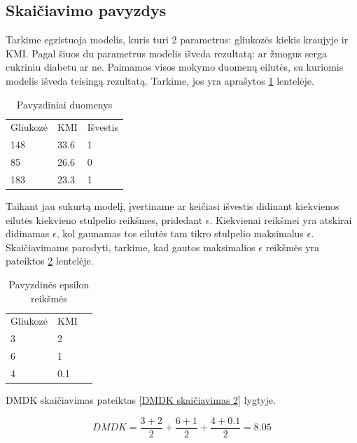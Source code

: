 \documentclass{VUMIFInfBakalaurinis}
\begin{document}
\subsection{Skaičiavimo pavyzdys}
\par Tarkime egzistuoja modelis, kuris turi 2 parametrus: gliukozės kiekis kraujyje ir KMI. Pagal šiuos du parametrus modelis išveda rezultatą: ar žmogus serga cukriniu diabetu ar ne. Paimamos visos mokymo duomenų eilutės, su kuriomis modelis išveda teisingą rezultatą. Tarkime, jos yra aprašytos \ref{tab:Pavyzdiniai duomenys 1} lentelėje.

\begin{table}[h]
\centering
\begin{tabular}{|l|l|l|}
\cline{1-3}
Gliukozė & KMI  & Išvestis \\\cline{1-3}
148      & 33.6 & 1        \\\cline{1-3}
85       & 26.6 & 0        \\\cline{1-3}
183      & 23.3 & 1        \\\cline{1-3}
\end{tabular}
\caption{Pavyzdiniai duomenys}
\label{tab:Pavyzdiniai duomenys 1}
\end{table}

\par Taikant jau sukurtą modelį, įvertiname ar keičiasi išvestis didinant kiekvienos eilutės kiekvieno stulpelio reikšmes, pridedant $\epsilon$. Kiekvienai reikšmei yra atskirai didinamas $\epsilon$, kol gaunamas tos eilutės tam tikro stulpelio maksimalus $\epsilon$. Skaičiavimams parodyti, tarkime, kad gautos maksimalios $\epsilon$ reikšmės yra pateiktos \ref{tab:my-table2} lentelėje.

\begin{table}[t]
\centering
\begin{tabular}{|l|l|l|}
\cline{1-2}
Gliukozė & KMI \\\cline{1-2}
3      & 2 \\\cline{1-2}
6       & 1 \\\cline{1-2}
4      & 0.1 \\\cline{1-2}
\end{tabular}
\caption{Pavyzdinės epsilon reikšmės}
\label{tab:my-table2}
\end{table}

\par DMDK skaičiavimas pateiktas \eqref{DMDK skaičiavimas 2} lygtyje.

\begin{equation}
DMDK = \frac{3 + 2}{2} + \frac{6 + 1}{2} + \frac{4 + 0.1}{2} = 8.05
\label{DMDK skaičiavimas 2}
\end{equation}
\end{document}
